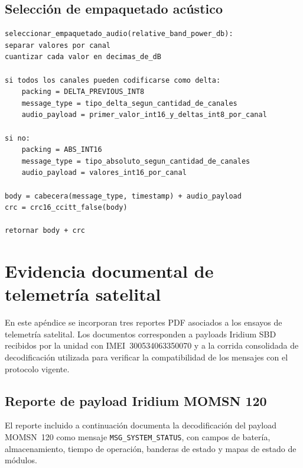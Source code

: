 \subsection{Selección de empaquetado acústico}

\begin{lstlisting}[style=pseudocodigo, caption={Selección de empaquetado para productos acústicos.}, label={lst:seleccion_empaquetado_audio}]
seleccionar_empaquetado_audio(relative_band_power_db):
separar valores por canal
cuantizar cada valor en decimas_de_dB

si todos los canales pueden codificarse como delta:
    packing = DELTA_PREVIOUS_INT8
    message_type = tipo_delta_segun_cantidad_de_canales
    audio_payload = primer_valor_int16_y_deltas_int8_por_canal

si no:
    packing = ABS_INT16
    message_type = tipo_absoluto_segun_cantidad_de_canales
    audio_payload = valores_int16_por_canal

body = cabecera(message_type, timestamp) + audio_payload
crc = crc16_ccitt_false(body)

retornar body + crc

\end{lstlisting}

\clearpage

\section{Evidencia documental de telemetría satelital}
\label{ap:evidencia_telemetria_satelital}

En este apéndice se incorporan tres reportes PDF asociados a los ensayos de telemetría satelital. Los documentos corresponden a payloads Iridium SBD recibidos por la unidad con IMEI~300534063350070 y a la corrida consolidada de decodificación utilizada para verificar la compatibilidad de los mensajes con el protocolo vigente.

\subsection{Reporte de payload Iridium MOMSN 120}
\label{ap:reporte_sbd_momsn_120}

El reporte incluido a continuación documenta la decodificación del payload MOMSN~120 como mensaje \texttt{MSG\_SYSTEM\_STATUS}, con campos de batería, almacenamiento, tiempo de operación, banderas de estado y mapas de estado de módulos.



